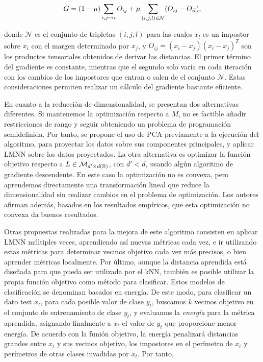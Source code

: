\[ G = (1-\mu) \sum_{i,j\rightsquigarrow i} O_{ij} + \mu \sum_{(i,j,l) \in \mathcal{N}} (O_{ij} - O_{il}), \]

donde $\mathcal{N}$ es el conjunto de tripletas $(i,j,l)$ para las cuales $x_l$ es un impostor sobre $x_i$ con el margen determinado por $x_j$, y $O_{ij} = (x_i - x_j)(x_i - x_j)^T$ son los productos tensoriales obtenidos de derivar las distancias. El primer término del gradiente es constante, mientras que el segundo solo varía en cada iteración con los cambios de los impostores que entran o salen de el conjunto $\mathcal{N}$. Estas consideraciones permiten realizar un cálculo del gradiente bastante eficiente.

En cuanto a la reducción de dimensionalidad, se presentan dos alternativas diferentes. Si mantenemos la optimización respecto a $M$, no es factible añadir restricciones de rango y seguir obteniendo un problema de programación semidefinida. Por tanto, se propone el uso de PCA previamente a la ejecución del algoritmo, para proyectar los datos sobre sus componentes principales, y aplicar LMNN sobre los datos proyectados. La otra alternativa es optimizar la función objetivo respecto a $L \in \mathcal{M}_{d'\times d(\mathbb{R})}$, con $d' < d$, usando algún algoritmo de gradiente descendente. En este caso la optimización no es convexa, pero aprendemos directamente una transformación lineal que reduce la dimensionalidad sin realizar cambios en el problema de optimización. Los autores afirman además, basados en los resultados empíricos, que esta optimización no convexa da buenos resultados.

Otras propuestas realizadas para la mejora de este algoritmo consisten en aplicar LMNN múltiples veces, aprendiendo así nuevas métricas cada vez, e ir utilizando estas métricas para determinar vecinos objetivo cada vez más precisos, o bien aprender métricas localmente. Por último, aunque la distancia aprendida está diseñada para que pueda ser utilizada por el kNN, también es posible utilizar la propia función objetivo como método para clasificar. Estos modelos de clasificación se denominan basados en energía. De este modo, para clasificar un dato test $x_t$, para cada posible valor de clase $y_t$, buscamos $k$ vecinos objetivo en el conjunto de entrenamiento de clase $y_t$, y evaluamos la \emph{energía} para la métrica aprendida, asignando finalmente a $x_t$ el valor de $y_t$ que proporcione menor energía. De acuerdo con la funión objetivo, la energía penalizará distancias grandes entre $x_t$ y sus vecinos objetivo, los impostores en el perímetro de $x_t$ y perímetros de otras clases invadidas por $x_t$. Por tanto,

